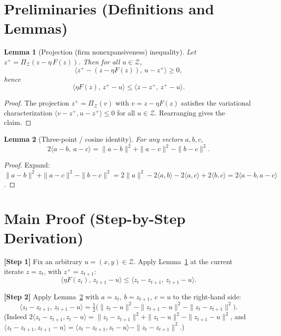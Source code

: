 \documentclass[11pt]{article}
\newtheorem{lemma}{Lemma}
\begin{document}
\section*{Preliminaries (Definitions and Lemmas)}

\begin{lemma}[Projection (firm nonexpansiveness) inequality]\label{lem:proj}
Let $z^+ = \Pi_{\mathcal{Z}}(z - \eta\, F(z))$. Then for all $u\in\mathcal{Z}$,
\[
\langle z^+ - (z-\eta F(z)),\, u - z^+\rangle \ge 0,
\]
hence
\[
\langle \eta F(z),\, z^+ - u\rangle \le \langle z - z^+,\, z^+ - u\rangle.
\]
\end{lemma}

\begin{proof}
The projection $z^+=\Pi_{\mathcal{Z}}(v)$ with $v=z-\eta F(z)$ satisfies the
variational characterization $\langle v - z^+, u - z^+\rangle \le 0$ for all
$u\in\mathcal{Z}$. Rearranging gives the claim.
\end{proof}

\begin{lemma}[Three-point / cosine identity]\label{lem:three}
For any vectors $a,b,c$,
\[
2\langle a-b,\ a-c\rangle = \|a-b\|^2 + \|a-c\|^2 - \|b-c\|^2.
\]
\end{lemma}

\begin{proof}
Expand: $\|a-b\|^2+\|a-c\|^2-\|b-c\|^2
= 2\|a\|^2 -2\langle a,b\rangle -2\langle a,c\rangle +2\langle b,c\rangle
= 2\langle a-b,a-c\rangle$.
\end{proof}

\section*{Main Proof (Step-by-Step Derivation)}

\noindent\textbf{[Step 1]} Fix an arbitrary $u=(x,y)\in\mathcal{Z}$. Apply
Lemma~\ref{lem:proj} at the current iterate $z=z_t$, with $z^+=z_{t+1}$:
\[
\langle \eta F(z_t),\, z_{t+1} - u\rangle
\le \langle z_t - z_{t+1},\, z_{t+1} - u\rangle.
\]

\medskip
\noindent\textbf{[Step 2]} Apply Lemma~\ref{lem:three} with
$a=z_t,\ b=z_{t+1},\ c=u$ to the right-hand side:
\[
\langle z_t - z_{t+1},\, z_{t+1} - u\rangle
= \tfrac12\Big( \|z_t-u\|^2 - \|z_{t+1}-u\|^2 - \|z_t - z_{t+1}\|^2\Big).
\]
(Indeed $2\langle z_t-z_{t+1},z_t-u\rangle=\|z_t-z_{t+1}\|^2+\|z_t-u\|^2-\|z_{t+1}-u\|^2$,
and $\langle z_t-z_{t+1},z_{t+1}-u\rangle=\langle z_t-z_{t+1},z_t-u\rangle-\|z_t-z_{t+1}\|^2$.)
\end{document}
